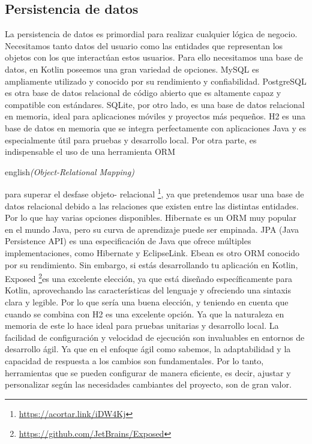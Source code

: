 \subsection{Persistencia de datos}

La persistencia de datos es primordial para realizar cualquier lógica de negocio. Necesitamos tanto 
datos del usuario como las entidades que representan los objetos con los que interactúan estos 
usuarios. Para ello necesitamos una base de datos, en Kotlin poseemos una gran variedad de opciones. 
MySQL es ampliamente utilizado y conocido por su rendimiento y confiabilidad. PostgreSQL es otra base 
de datos relacional de código abierto que es altamente capaz y compatible con estándares. SQLite, por 
otro lado, es una base de datos relacional en memoria, ideal para aplicaciones móviles y proyectos más 
pequeños. H2 es una base de datos en memoria que se integra perfectamente con aplicaciones Java y es 
especialmente útil para pruebas y desarrollo local. Por otra parte, es indispensable el uso de una 
herramienta ORM \begin{otherlanguage}
{english}\textit{(Object-Relational Mapping)}\end{otherlanguage} para superar el desfase objeto-
relacional \footnote{\url{https://acortar.link/iDW4Kj}}, ya que pretendemos usar una base de datos 
relacional debido a las relaciones que existen entre las distintas entidades. Por lo que hay varias 
opciones disponibles. Hibernate es un ORM muy popular en el mundo Java, pero su curva de aprendizaje 
puede ser empinada. JPA (Java Persistence API) es una especificación de Java que ofrece múltiples 
implementaciones, como Hibernate y EclipseLink. Ebean es otro ORM conocido por su rendimiento. Sin 
embargo, si estás desarrollando tu aplicación en Kotlin, Exposed 
\footnote{\url{https://github.com/JetBrains/Exposed}}es una excelente elección, ya que está diseñado 
específicamente para Kotlin, aprovechando las características del lenguaje y ofreciendo una sintaxis 
clara y legible. Por lo que sería una buena elección, y teniendo en cuenta que cuando se combina con  
H2 es una excelente opción. Ya que la naturaleza en memoria de este lo hace ideal para pruebas 
unitarias y desarrollo local. La facilidad de configuración y velocidad de ejecución son invaluables en 
entornos de desarrollo ágil. Ya que en el enfoque ágil como sabemos, la adaptabilidad y la capacidad de 
respuesta a los cambios son fundamentales. Por lo tanto, herramientas que se pueden configurar de 
manera eficiente, es decir, ajustar y personalizar según las necesidades cambiantes del proyecto, son 
de gran valor.

